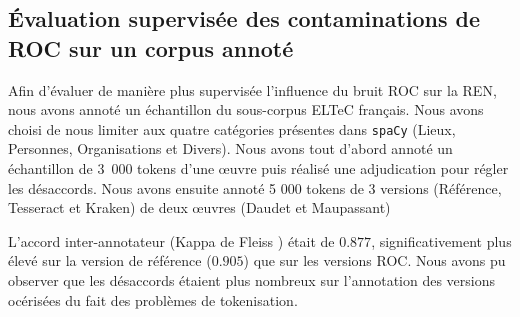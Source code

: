 %    
%



\subsection{\'Evaluation supervisée des contaminations de ROC sur un corpus annoté}
\label{subsec:eval_supervis_OCR-IMPACT-NER}
Afin d'évaluer de manière plus supervisée l'influence du bruit ROC sur la REN, nous avons annoté un échantillon du sous-corpus ELTeC français.
 Nous avons choisi de nous limiter aux quatre catégories présentes dans \texttt{spaCy} (Lieux, Personnes, Organisations et Divers).
  Nous avons tout d'abord annoté un échantillon de 3~000 tokens d'une œuvre  puis réalisé une adjudication pour régler les désaccords. 
  Nous avons ensuite annoté 5 000 tokens de 3 versions (Référence, Tesseract et Kraken) de deux œuvres (Daudet et Maupassant)

L'accord inter-annotateur (Kappa de  Fleiss \cite{fleiss2013statistical}) était de $0.877$, significativement plus élevé sur la version de référence ($0.905$) que sur les versions ROC. Nous avons pu observer que les désaccords étaient plus nombreux sur l'annotation des versions océrisées du fait des problèmes de tokenisation.

